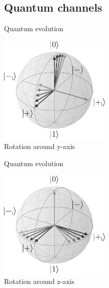         \subsection{Quantum channels}
        \begin{frame}{Quantum evolution}
            \begin{center}
                \includegraphics[width=0.4\textwidth]{pics/Ry}\\
                Rotation around y-axis
            \end{center}
        \end{frame}
        \begin{frame}{Quantum evolution}
            \begin{center}
                \includegraphics[width=0.4\textwidth]{pics/Rz}\\
                Rotation around z-axis
            \end{center}
        \end{frame}
